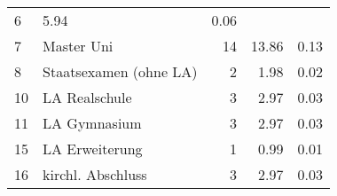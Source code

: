 \begin{longtable}{lXrrr}
       \num{6} &
       \num[round-mode=places,round-precision=2]{5,94} &
         \num[round-mode=places,round-precision=2]{0,06} \\

     7 &
     \multicolumn{1}{X}{ Master Uni   } &


       \num{14} &
       \num[round-mode=places,round-precision=2]{13,86} &
         \num[round-mode=places,round-precision=2]{0,13} \\

     8 &
     \multicolumn{1}{X}{ Staatsexamen (ohne LA)   } &


       \num{2} &
       \num[round-mode=places,round-precision=2]{1,98} &
         \num[round-mode=places,round-precision=2]{0,02} \\

     10 &
     \multicolumn{1}{X}{ LA Realschule   } &


       \num{3} &
       \num[round-mode=places,round-precision=2]{2,97} &
         \num[round-mode=places,round-precision=2]{0,03} \\

     11 &
     \multicolumn{1}{X}{ LA Gymnasium   } &


       \num{3} &
       \num[round-mode=places,round-precision=2]{2,97} &
         \num[round-mode=places,round-precision=2]{0,03} \\

     15 &
     \multicolumn{1}{X}{ LA Erweiterung   } &


       \num{1} &
       \num[round-mode=places,round-precision=2]{0,99} &
         \num[round-mode=places,round-precision=2]{0,01} \\

     16 &
     \multicolumn{1}{X}{ kirchl. Abschluss   } &


       \num{3} &
       \num[round-mode=places,round-precision=2]{2,97} &
         \num[round-mode=places,round-precision=2]{0,03} \\


\end{longtable}
